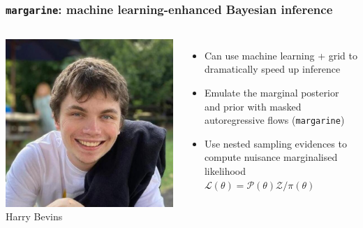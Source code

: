 \documentclass[aspectratio=169]{beamer}
\begin{document}
\begin{frame}
    \frametitle{\texttt{margarine}: machine learning-enhanced Bayesian inference}

    \begin{columns}
        \begin{columns}
            \includegraphics[width=\textwidth]{figures/harry_bevins.jpg}
            Harry Bevins \\  \\ 
            \begin{itemize}
                \item Can use machine learning + grid to dramatically speed up inference
                \item Emulate the marginal posterior and prior with  masked autoregressive flows (\texttt{margarine})
                \item Use nested sampling evidences to compute nuisance marginalised likelihood $\mathcal{L}(\theta) = \mathcal{P}(\theta) \mathcal{Z}/\pi(\theta)$
            \end{itemize}
        \end{columns}
        \vspace{5pt}


\end{columns}
\end{frame}
\end{document}
